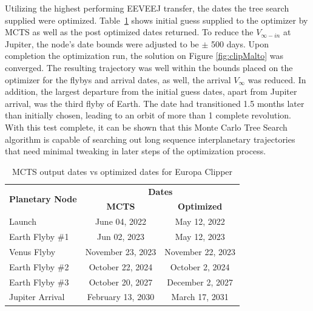 \documentclass[letterpaper, preprint, paper,11pt]{AAS}	%
\begin{document}
Utilizing the highest performing EEVEEJ transfer, the dates the tree search supplied were optimized. Table~\ref*{table:clipMInputs} shows initial guess supplied to the optimizer by MCTS as well as the post optimized dates returned. To reduce the $V_{\infty-in}$ at Jupiter, the node's date bounds were adjusted to be $\pm$ 500 days. Upon completion the optimization run, the solution on Figure \ref*{fig:clipMalto} was converged. The resulting trajectory was well within the bounds placed on the optimizer for the flybys and arrival dates, as well, the arrival $V_\infty$ was reduced. In addition, the largest departure from the initial guess dates, apart from Jupiter arrival, was the third flyby of Earth. The date had transitioned 1.5 months later than initially chosen, leading to an orbit of more than 1 complete revolution. With this test complete, it can be shown that this Monte Carlo Tree Search algorithm is capable of searching out long sequence interplanetary trajectories that need minimal tweaking in later steps of the optimization process.
\begin{table}[htb]
    \begin{center}
        \caption{MCTS output dates vs optimized dates for Europa Clipper}
        \label{table:clipMInputs}
        \begin{tabular}{lcc}
            \toprule
            \multirow{2}{*}{\textbf{Planetary Node}} & \multicolumn{2}{c}{\textbf{Dates}}\\
            \cmidrule{2-3}
            {} & \textbf{MCTS} & \textbf{Optimized}\\
            \midrule
            Launch & June 04, 2022 & May 12, 2022 \\
            Earth Flyby \#1 & Jun 02, 2023 & May 12, 2023 \\
            Venus Flyby & November 23, 2023 & November 22, 2023 \\
            Earth Flyby \#2 & October 22, 2024 & October 2, 2024 \\
            Earth Flyby \#3 & October 20, 2027 & December 2, 2027 \\
            Jupiter Arrival & February 13, 2030 & March 17, 2031 \\
            \bottomrule
        \end{tabular}
    \end{center}
\end{table}
\end{document}
